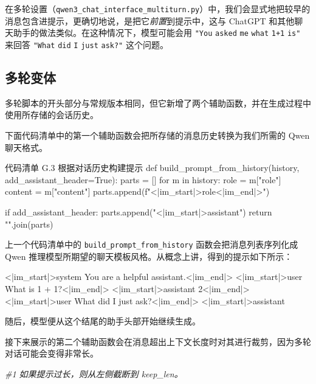 在多轮设置（\texttt{qwen3\_chat\_interface\_multiturn.py}）中，我们会显式地把较早的消息包含进提示，更确切地说，是把它\emph{前置}到提示中，这与 ChatGPT 和其他聊天助手的做法类似。在这种情况下，模型可能会用 \texttt{"}\texttt{You} \texttt{asked} \texttt{me} \texttt{what} \texttt{1+1} \texttt{is}\texttt{"} 来回答 \texttt{"}\texttt{What} \texttt{did} \texttt{I} \texttt{just} \texttt{ask?}\texttt{"} 这个问题。

\subsection{多轮变体}

多轮脚本的开头部分与常规版本相同，但它新增了两个辅助函数，并在生成过程中使用所存储的会话历史。

下面代码清单中的第一个辅助函数会把所存储的消息历史转换为我们所需的 Qwen 聊天格式。

\begin{codeboxt}{代码清单 G.3 根据对话历史构建提示}
def build_prompt_from_history(history, add_assistant_header=True):
    parts = []
    for m in history:
        role = m["role"]
        content = m["content"]
        parts.append(f"<|im_start|>{role}<|im_end|>\n")

    if add_assistant_header:
        parts.append("<|im_start|>assistant\n")
    return "".join(parts)
\end{codeboxt}

上一个代码清单中的 \texttt{build\_prompt\_from\_history} 函数会把消息列表序列化成 Qwen 推理模型所期望的聊天模板风格。从概念上讲，得到的提示如下所示：

\begin{codebox}
<|im_start|>system
You are a helpful assistant.<|im_end|>
<|im_start|>user
What is 1 + 1?<|im_end|>
<|im_start|>assistant
2<|im_end|>
<|im_start|>user
What did I just ask?<|im_end|>
<|im_start|>assistant
\end{codebox}

随后，模型便从这个结尾的助手头部开始继续生成。

接下来展示的第二个辅助函数会在消息超出上下文长度时对其进行裁剪，因为多轮对话可能会变得非常长。

{\noindent\small\textit{\#1 如果提示过长，则从左侧截断到 keep\_len。}\par}

